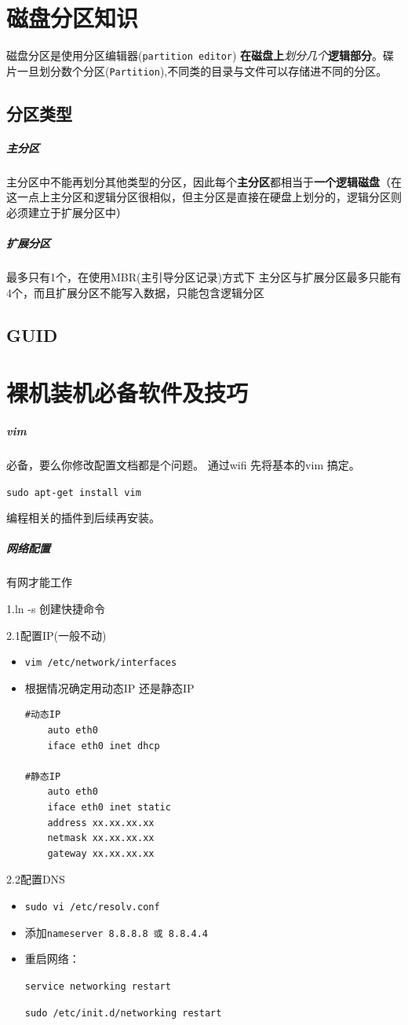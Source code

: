 \documentclass[UTF8,a4paper,12pt]{ctexbook}
\begin{document}
		\section{磁盘分区知识}
			 磁盘分区是使用分区编辑器(\verb|partition editor|) \textbf{在磁盘上}\textit{划分几个}\textbf{逻辑部分}。碟片一旦划分数个分区(\verb|Partition|),不同类的目录与文件可以存储进不同的分区。
			 
			 \subsection{分区类型}
				 \subparagraph{主分区}
					 主分区中不能再划分其他类型的分区，因此每个\textbf{主分区}都相当于\textbf{一个逻辑磁盘}（在这一点上主分区和逻辑分区很相似，但主分区是直接在硬盘上划分的，逻辑分区则必须建立于扩展分区中）
					 
				 \subparagraph{扩展分区}
					 最多只有1个，在使用MBR(主引导分区记录)方式下 主分区与扩展分区最多只能有4个，而且扩展分区不能写入数据，只能包含逻辑分区
					 
			\subsection{GUID}
	\section{裸机装机必备软件及技巧}
		\subparagraph{vim}必备，要么你修改配置文档都是个问题。
			通过wifi 先将基本的vim 搞定。
			
			\verb|sudo apt-get install vim|
			
			编程相关的插件到后续再安装。
			
		\subparagraph{网络配置}有网才能工作
			
			1.ln -s 创建快捷命令
			
			2.1配置IP(一般不动)
			\begin{itemize}[itemindent = 1em]
				\item \verb|vim /etc/network/interfaces|
				\item 根据情况确定用动态IP 还是静态IP 
				\begin{lstlisting}
#动态IP 
	auto eth0
	iface eth0 inet dhcp
	
#静态IP
	auto eth0
	iface eth0 inet static
	address xx.xx.xx.xx
	netmask xx.xx.xx.xx
	gateway xx.xx.xx.xx
				\end{lstlisting}
			\end{itemize}
			
			2.2配置DNS
			\begin{itemize}[itemindent = 1em]
				\item \verb|sudo vi /etc/resolv.conf|
				\item 添加\verb|nameserver 8.8.8.8 或 8.8.4.4|
				\item 重启网络：
				
				\verb|service networking restart|
				
				\verb|sudo /etc/init.d/networking restart|
			\end{itemize}
			
\end{document}
